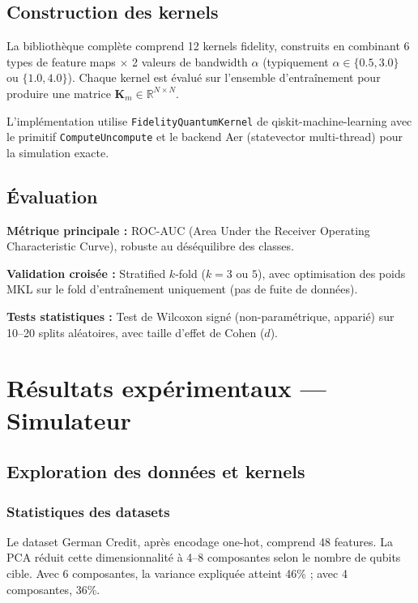 \documentclass[12pt,a4paper]{article}
\newcommand{\K}{\mathbf{K}}
\newcommand{\R}{\mathbb{R}}
\begin{document}
\subsection{Construction des kernels}

La bibliothèque complète comprend 12 kernels fidelity, construits en combinant 6 types de feature maps $\times$ 2 valeurs de bandwidth $\alpha$ (typiquement $\alpha \in \{0.5, 3.0\}$ ou $\{1.0, 4.0\}$). Chaque kernel est évalué sur l'ensemble d'entraînement pour produire une matrice $\K_m \in \R^{N \times N}$.

L'implémentation utilise \texttt{FidelityQuantumKernel} de qiskit-machine-learning avec le primitif \texttt{ComputeUncompute} et le backend Aer (statevector multi-thread) pour la simulation exacte.

\subsection{Évaluation}

\textbf{Métrique principale :} ROC-AUC (Area Under the Receiver Operating Characteristic Curve), robuste au déséquilibre des classes.

\textbf{Validation croisée :} Stratified $k$-fold ($k = 3$ ou $5$), avec optimisation des poids MKL sur le fold d'entraînement uniquement (pas de fuite de données).

\textbf{Tests statistiques :} Test de Wilcoxon signé (non-paramétrique, apparié) sur 10--20 splits aléatoires, avec taille d'effet de Cohen ($d$).

\section{Résultats expérimentaux — Simulateur}
\label{sec:resultats_simulateur}

\subsection{Exploration des données et kernels}

\subsubsection{Statistiques des datasets}

Le dataset German Credit, après encodage one-hot, comprend 48 features. La PCA réduit cette dimensionnalité à 4--8 composantes selon le nombre de qubits cible. Avec 6 composantes, la variance expliquée atteint 46\% ; avec 4 composantes, 36\%.
\end{document}
